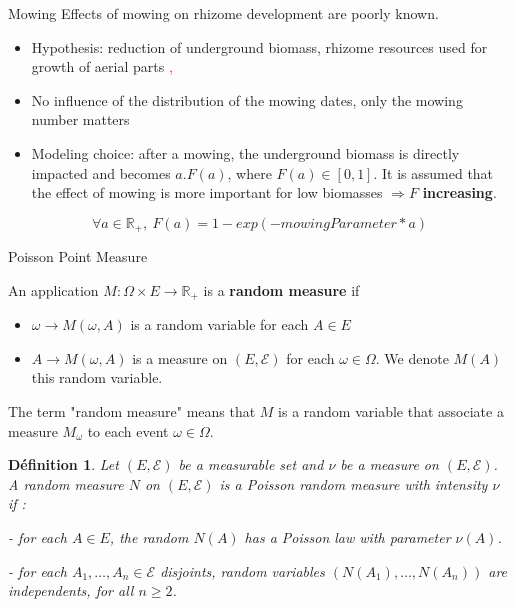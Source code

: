 \documentclass{myBeamer}
\newcommand{\R}{\mathbb R}%
\newcommand{\Ecal}{\mathcal{E}}%
\newtheorem{Def}{Définition}%
\begin{document}
\begin{frame}{Mowing}
Effects of mowing on rhizome development are poorly known.
\begin{itemize}
\item Hypothesis: reduction of underground biomass, rhizome resources used for growth of aerial parts \textcolor{red}{\cite{gerber2010evaluating}, \cite{rouifed2011contrasting}}
\item No influence of the distribution of the mowing dates, only the mowing number matters \textcolor{red}{\cite{seiger1997mechanical}}
\item Modeling choice: after a mowing, the underground biomass is directly impacted and becomes $a.F (a)$, where $F(a) \in [0,1]$. It is assumed that the effect of mowing is more important for low biomasses $ \Rightarrow F$ \textbf{increasing}.
\end{itemize}

\begin{equation*}
\forall a \in \R_+, ~F(a) = 1- exp(-mowingParameter  * a)
\end{equation*} 

\end{frame}





\begin{frame}{Poisson Point Measure} 
\addtocounter{framenumber}{-1}
An application $M : \Omega \times E \rightarrow \R_+ $ is a \textbf{random measure} if 
\begin{itemize}
\item $\omega  \rightarrow M(\omega,A)$ is a random variable for each $ A \in E$
\item $ A \rightarrow M(\omega,A)$ is a measure on $(E, \Ecal)$ for each $\omega \in \Omega$. We denote $M(A)$ this random variable.
\end{itemize} 
  
 
The term "random measure" means that $M$ is a random variable that associate a measure $M_\omega$ to each event $ \omega \in \Omega$. 
 
\begin{Def}
Let $(E, \Ecal)$ be a measurable set and $ \nu$ be a measure on $(E, \Ecal)$.
A random measure $N$ on $(E, \Ecal)$ is a Poisson random measure with intensity $\nu$
if :

- for each $A \in E$, the random $N(A)$ has a Poisson law with parameter $ \nu(A)$.

-  for each $A_1,\ldots,A_n \in \Ecal$ disjoints, random variables  $(N(A_1), \ldots, N(A_n))$ are independents, for all  $n \geq 2$.
\end{Def}

\end{frame}
\end{document}
